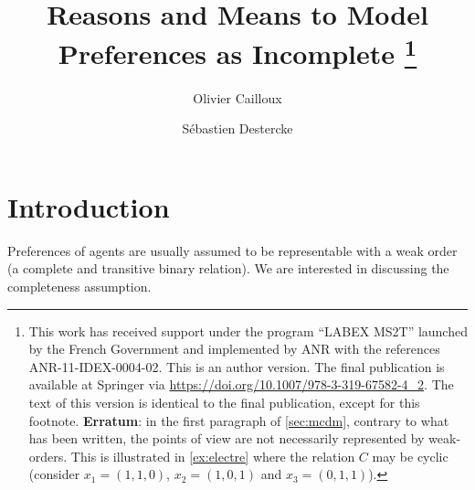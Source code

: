 \documentclass[version=last, pagesize, twocolumn, twoside=off, bibliography=totoc, 12pt, a4paper, english]{scrartcl}
\begin{document}
\title{%
	\texorpdfstring{%
		Reasons and Means to Model Preferences as Incomplete%
		\thanks{This work has received support under the program “LABEX MS2T” launched by the French Government and implemented by ANR with the references ANR-11-IDEX-0004-02.
		This is an author version. The final publication is available at Springer via \url{https://doi.org/10.1007/978-3-319-67582-4_2}. The text of this version is identical to the final publication, except for this footnote.
		\textbf{Erratum}: in the first paragraph of \cref{sec:mcdm}, contrary to what has been written, the points of view are not necessarily represented by weak-orders. This is illustrated in \cref{ex:electre} where the relation $C$ may be cyclic (consider $x_1 = (1, 1, 0)$, $x_2 = (1, 0, 1)$ and $x_3 = (0, 1, 1)$).}
	}{Reasons and Means to Model Preferences as Incomplete%
	}
}
\author{Olivier Cailloux}
\author{Sébastien Destercke}
\date{}
\maketitle



\section{Introduction}\label{sec:intro}
Preferences of agents are usually assumed to be representable with a weak order (a complete and transitive binary relation). We are interested in discussing the completeness assumption. 
	
\end{document}
